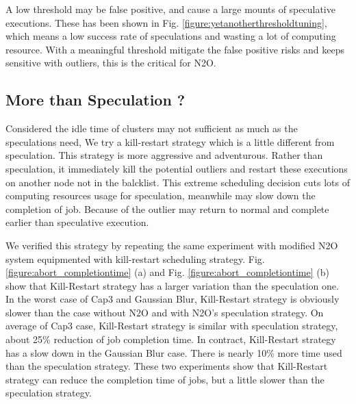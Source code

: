 A low threshold may be false positive, and cause a large mounts of speculative executions. These has been shown in Fig.  \ref{figure:yetanotherthresholdtuning}, which means a low success rate of speculations and wasting a lot of computing resource. With a meaningful threshold mitigate the false positive risks and keeps sensitive with outliers, this is the critical for N2O.

\subsection{More than Speculation ?}

Considered the idle time of clusters may not sufficient as much as the speculations need, We try a kill-restart strategy which is a little different from speculation. This strategy is more aggressive and adventurous. Rather than speculation, it immediately kill the potential outliers and restart these executions on another node not in the balcklist. This extreme scheduling decision cuts lots of computing resources usage for speculation, meanwhile may slow down the completion of job. Because of the outlier may return to normal and complete earlier than speculative execution.

We verified this strategy by repeating the same experiment with modified N2O system equipmented with kill-restart scheduling strategy. Fig. \ref{figure:abort_completiontime} (a) and Fig. \ref{figure:abort_completiontime} (b) show that Kill-Restart strategy has a larger variation than the speculation one. In the worst case of Cap3 and Gaussian Blur, Kill-Restart strategy is obviously slower than the case without N2O and with N2O's speculation strategy. On average of Cap3 case, Kill-Restart strategy is similar with speculation strategy, about 25\% reduction of job completion time. In contract, Kill-Restart strategy has a slow down in the Gaussian Blur case. There is nearly 10\% more time used than the speculation strategy. These two experiments show that Kill-Restart strategy can reduce the completion time of jobs, but a little slower than the speculation strategy.

